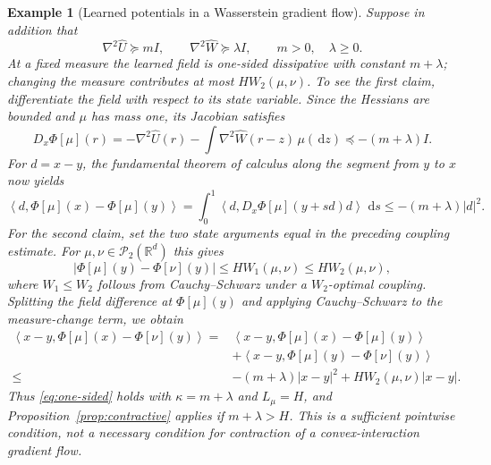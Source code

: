 \documentclass[11pt]{amsart}
\numberwithin{equation}{section}
\theoremstyle{plain}
\newtheorem{example}[theorem]{Example}
\newcommand{\R}{\mathbb{R}}
\newcommand{\cP}{\mathcal{P}}
\newcommand{\dd}{\,\mathrm{d}}
\newcommand{\abs}[1]{\left\lvert#1\right\rvert}
\newcommand{\ip}[2]{\left\langle#1,#2\right\rangle}
\begin{document}
\begin{example}[Learned potentials in a Wasserstein gradient flow]
Suppose in addition that
\[
 \nabla^2\widehat U\succeq mI,\qquad
 \nabla^2\widehat W\succeq\lambda I,
 \qquad m>0,\quad\lambda\geq0.
\]
At a fixed measure the learned field is one-sided dissipative with constant
$m+\lambda$; changing the measure contributes at most $H W_2(\mu,\nu)$. 
To see the first claim, differentiate the field with respect to its state
variable.  Since the Hessians are bounded and $\mu$ has mass one, its Jacobian
satisfies
\[
 D_x\Phi[\mu](r)
 =-\nabla^2\widehat U(r)
  -\int\nabla^2\widehat W(r-z)\,\mu(\dd z)
 \preceq-(m+\lambda)I.
\]
For $d=x-y$, the fundamental theorem of calculus along the segment from
$y$ to $x$ now yields
\[
 \ip{d}{\Phi[\mu](x)-\Phi[\mu](y)}
 =\int_0^1\ip{d}{D_x\Phi[\mu](y+sd)d}\,\dd s
 \leq-(m+\lambda)\abs{d}^2.
\]
For the second claim, set the two state arguments equal in the preceding
coupling estimate.  For $\mu,\nu\in\cP_2(\R^d)$ this gives
\[
 \abs{\Phi[\mu](y)-\Phi[\nu](y)}
 \leq H W_1(\mu,\nu)\leq H W_2(\mu,\nu),
\]
where $W_1\leq W_2$ follows from Cauchy--Schwarz under a $W_2$-optimal
coupling.  Splitting the field difference at $\Phi[\mu](y)$ and applying
Cauchy--Schwarz to the measure-change term, we obtain
\[
\begin{aligned}
 \ip{x-y}{\Phi[\mu](x)-\Phi[\nu](y)}
 ={}&\ip{x-y}{\Phi[\mu](x)-\Phi[\mu](y)}\\
 &+\ip{x-y}{\Phi[\mu](y)-\Phi[\nu](y)}\\
 \leq{}&-(m+\lambda)\abs{x-y}^2
       +H W_2(\mu,\nu)\abs{x-y}.
\end{aligned}
\]
Thus \eqref{eq:one-sided} holds with $\kappa=m+\lambda$ and $L_\mu=H$,
and Proposition~\ref{prop:contractive} applies if $m+\lambda>H$.
This is a sufficient pointwise condition, not a necessary condition for
contraction of a convex-interaction gradient flow.


\end{example}
\end{document}
